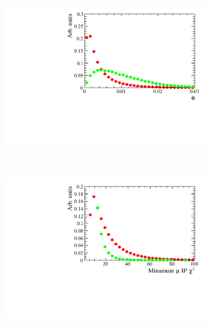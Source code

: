 \begin{figure}[htbp]
    \begin{subfigure}[b]{0.4\textwidth}
        \includegraphics[width=\textwidth]{./Figs/Selection/var3_sim_all.pdf}
    \end{subfigure}
    ~ %
    \begin{subfigure}[b]{0.4\textwidth}
       \includegraphics[width=\textwidth]{./Figs/Selection/var4_sim_all.pdf}
    \end{subfigure}


\end{figure}
